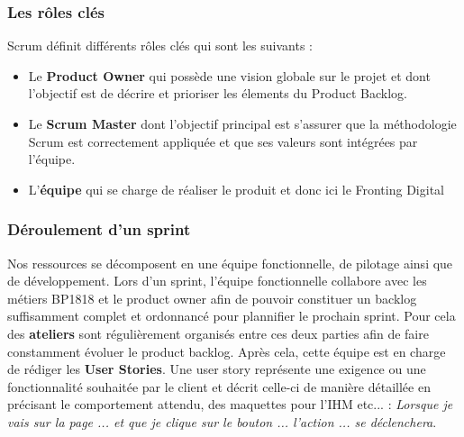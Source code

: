 	\subsubsection{Les rôles clés}
	Scrum définit différents rôles clés qui sont les suivants :
	\begin{itemize}
		\item Le \textbf{Product Owner} qui possède une vision globale sur le projet et dont l'objectif est de décrire et prioriser les élements du Product Backlog.
		\item Le \textbf{Scrum Master} dont l'objectif principal est s'assurer que la méthodologie Scrum est correctement appliquée et que ses valeurs sont intégrées par l'équipe.
		\item L'\textbf{équipe} qui se charge de réaliser le produit et donc ici le Fronting Digital
	\end{itemize}
	
	\subsubsection{Déroulement d'un sprint}
	Nos ressources se décomposent en une équipe fonctionnelle, de pilotage ainsi que de développement. Lors d'un sprint, l'équipe fonctionnelle collabore avec les métiers BP1818 et le product owner afin de pouvoir constituer un backlog suffisamment complet et ordonnancé pour plannifier le prochain sprint. Pour cela des \textbf{ateliers} sont régulièrement organisés entre ces deux parties afin de faire constamment évoluer le product backlog. Après cela, cette équipe est en charge de rédiger les \textbf{User Stories}. Une user story représente une exigence ou une fonctionnalité souhaitée par le client et décrit celle-ci de manière détaillée en précisant le comportement attendu, des maquettes pour l'IHM etc... : \textit{Lorsque je vais sur la page ... et que je clique sur le bouton ... l'action ... se déclenchera}. \\
	
